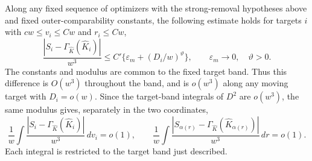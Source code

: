 \begin{proposition}\label{bud:modified-closure}
Along any fixed sequence of optimizers with the strong-removal hypotheses
above and fixed outer-comparability constants, the following estimate holds
for targets \(i\) with
\(cw\le v_i\le Cw\) and \(r_i\le Cw\),
\begin{equation}\label{eq:bud-coarse-closure}
 \frac{|S_i-\Gamma_{\widehat K}(\widehat K_i)|}{w^3}
 \le C'\{\varepsilon_m+(D_i/w)^\vartheta\},
 \qquad \varepsilon_m\longrightarrow0,\quad\vartheta>0.
\end{equation}
The constants and modulus are common to the fixed target band. Thus
this difference is \(O(w^3)\) throughout the band, and is
\(o(w^3)\) along any moving target with \(D_i=o(w)\).
Since the target-band integrals of \(D^2\) are \(o(w^3)\), the same
modulus gives, separately in the two coordinates,
\begin{equation}\label{eq:bud-coarse-closure-integrals}
 \frac1w\int
 \frac{|S_i-\Gamma_{\widehat K}(\widehat K_i)|}{w^3}\,dv_i=o(1),
 \qquad
 \frac1w\int
 \frac{|S_{\alpha(r)}-\Gamma_{\widehat K}(\widehat K_{\alpha(r)})|}
      {w^3}\,dr=o(1).
\end{equation}
Each integral is restricted to the target band just described.
\end{proposition}

